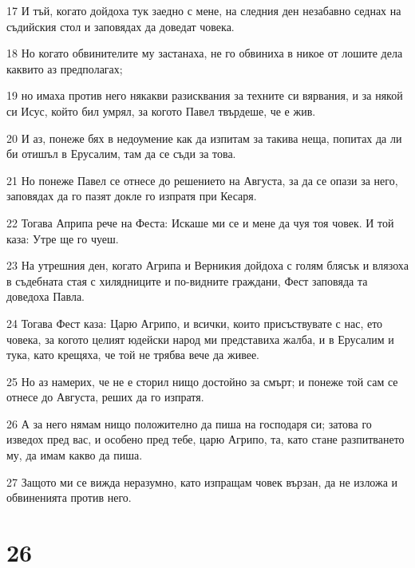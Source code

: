 \par 17 И тъй, когато дойдоха тук заедно с мене, на следния ден незабавно седнах на съдийския стол и заповядах да доведат човека.
\par 18 Но когато обвинителите му застанаха, не го обвиниха в никое от лошите дела каквито аз предполагах;
\par 19 но имаха против него някакви разисквания за техните си вярвания, и за някой си Исус, който бил умрял, за когото Павел твърдеше, че е жив.
\par 20 И аз, понеже бях в недоумение как да изпитам за такива неща, попитах да ли би отишъл в Ерусалим, там да се съди за това.
\par 21 Но понеже Павел се отнесе до решението на Августа, за да се опази за него, заповядах да го пазят докле го изпратя при Кесаря.
\par 22 Тогава Априпа рече на Феста: Искаше ми се и мене да чуя тоя човек. И той каза: Утре ще го чуеш.
\par 23 На утрешния ден, когато Агрипа и Верникия дойдоха с голям блясък и влязоха в съдебната стая с хилядниците и по-видните граждани, Фест заповяда та доведоха Павла.
\par 24 Тогава Фест каза: Царю Агрипо, и всички, които присъствувате с нас, ето човека, за когото целият юдейски народ ми представиха жалба, и в Ерусалим и тука, като крещяха, че той не трябва вече да живее.
\par 25 Но аз намерих, че не е сторил нищо достойно за смърт; и понеже той сам се отнесе до Августа, реших да го изпратя.
\par 26 А за него нямам нищо положително да пиша на господаря си; затова го изведох пред вас, и особено пред тебе, царю Агрипо, та, като стане разпитването му, да имам какво да пиша.
\par 27 Защото ми се вижда неразумно, като изпращам човек вързан, да не изложа и обвиненията против него.

\chapter{26}

